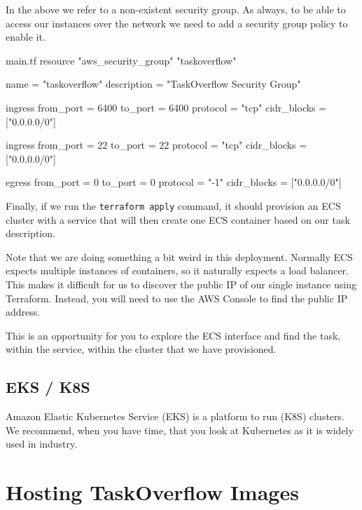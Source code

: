 \documentclass{csse4400}
\begin{document}
In the above we refer to a non-existent security group.
As always, to be able to access our instances over the network we need to add a security group policy to enable it.

\begin{code}[language=terraform,numbers=none]{main.tf}
resource "aws_security_group" "taskoverflow" {
    name = "taskoverflow"
    description = "TaskOverflow Security Group"
  
    ingress {
      from_port = 6400
      to_port = 6400
      protocol = "tcp"
      cidr_blocks = ["0.0.0.0/0"]
    }
  
    ingress {
      from_port = 22
      to_port = 22
      protocol = "tcp"
      cidr_blocks = ["0.0.0.0/0"]
    }
  
    egress {
      from_port = 0
      to_port = 0
      protocol = "-1"
      cidr_blocks = ["0.0.0.0/0"]
    }
}
\end{code}

Finally, if we run the \texttt{terraform apply} command,
it should provision an ECS cluster with a service that will then create one ECS container based on our task description.

Note that we are doing something a bit weird in this deployment.
Normally ECS expects multiple instances of containers,
so it naturally expects a load balancer.
This makes it difficult for us to discover the public IP of our single instance using Terraform.
Instead, you will need to use the AWS Console to find the public IP address.

This is an opportunity for you to explore the ECS interface and find the task, within the service, within the cluster that we have provisioned.


\subsection{EKS / K8S}

Amazon Elastic Kubernetes Service (EKS) is a platform to run  (K8S) clusters.
We recommend, when you have time, that you look at Kubernetes as it is widely used in industry.


\section{Hosting TaskOverflow Images}
\end{document}
